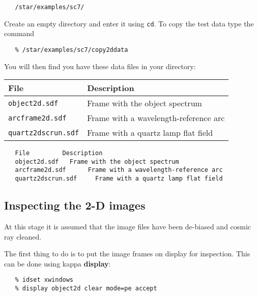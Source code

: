 \documentclass[twoside,11pt]{article}
\newenvironment{latexonly}{}{}
\newcommand{\xref}[3]{#1}
\newcommand{\scspec}[2]{#1}
\newcommand{\scspec}[2]{#2}
\begin{document}
{
\scspec{\small}{ }
\begin{verbatim}
   /star/examples/sc7/
\end{verbatim}
}

Create an empty directory and enter it using \verb+cd+\@.
To copy the test data type the command

{
\scspec{\small}{ }
\begin{verbatim}
   % /star/examples/sc7/copy2ddata
\end{verbatim}
}

You will then find you have these data files in your directory:

\begin{latexonly}
\begin{center}
\begin{tabular}{ll}
File & Description \\ \hline
{\tt object2d.sdf}  & Frame with the object spectrum\\
{\tt arcframe2d.sdf}     & Frame with a wavelength-reference arc\\
{\tt quartz2dscrun.sdf}    & Frame with a quartz lamp flat field\\
\end{tabular}
\end{center}
\end{latexonly}
\begin{htmlonly}
\begin{verbatim}
   File         Description
   object2d.sdf   Frame with the object spectrum
   arcframe2d.sdf      Frame with a wavelength-reference arc
   quartz2dscrun.sdf     Frame with a quartz lamp flat field
\end{verbatim}
\end{htmlonly}

\subsection{Inspecting the 2-D images}

At this stage it is assumed that the image files have been de-biased and
cosmic ray cleaned.

The first thing to do is to put the image frames on display for inspection.
This can be done using \xref{{\sc kappa}}{sun95}{}
\xref{{\bf display}}{sun95}{DISPLAY}:

{
\scspec{\small}{ }
\begin{verbatim}
   % idset xwindows
   % display object2d clear mode=pe accept
\end{verbatim}
}
\end{document}
